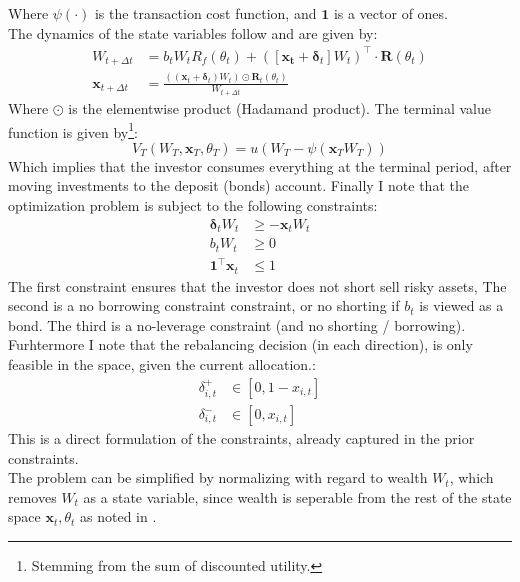 \documentclass[11pt]{article}
\begin{document}
Where $\psi(\cdot )$ is the transaction cost function, and $\mathbf{1}$ is a vector of ones.\\
The dynamics of the state variables follow \textcite{Schober2022} and are given by:
\begin{align}
  W_{t+\Delta t} &= b_t W_t R_f (\theta_t) +  ( [ \mathbf{x_t} + \boldsymbol{\delta}_t ] W_t )^{\top} \cdot \mathbf{R}(\theta_t) \\
  \mathbf{x}_{t+\Delta t} &=  \frac{( (\mathbf{x}_t + \boldsymbol{\delta}_t ) W_t ) \odot \mathbf{R}_t (\theta_t )}{ W_{t+\Delta t} }
\end{align}
Where $\odot$ is the elementwise product (Hadamand product). The terminal value function is
given by\footnote{Stemming from the sum of discounted utility.}:
\begin{equation} \label{eq: class_terminal_value_non_normalized}
  V_T (W_T , \mathbf{x}_T , \theta_T ) = u ( W_T - \psi ( \mathbf{x}_T W_T ))
\end{equation}
Which implies that the investor consumes everything at the terminal period, after moving investments to the deposit (bonds) account.
Finally I note that the optimization problem is subject to the following constraints:
\begin{align}
  \boldsymbol{\delta}_t W_t &\geq - \mathbf{x}_t W_t \\
  b_t W_t &\geq 0 \\
  \mathbf{1}^{\top} \mathbf{x}_t &\leq 1
\end{align}
The first constraint ensures that the investor does not short sell risky assets, 
The second is a no borrowing constraint constraint, or no shorting if $b_t$ is viewed as a bond.
The third is a no-leverage constraint (and no shorting / borrowing).\\
Furhtermore I note that the rebalancing decision (in each direction), is only feasible in the space, given the current allocation.:
\begin{align}
  \delta^{+}_{i,t} &\in [0 , 1-x_{i,t}]  \label{eq: delta+_space} \\
  \delta^{-}_{i,t} &\in [0 , x_{i,t}] \label{eq: delta-_space}
\end{align}
This is a direct formulation of the constraints, already captured in the prior constraints.\\
The problem can be simplified by normalizing with regard to wealth $W_t$, which removes $W_t$ as a state variable, since
wealth is seperable from the rest of the state space $\mathbf{x}_t , \theta_t$ as noted in \autocite{CaiJuddXu2013}.\\
\end{document}

